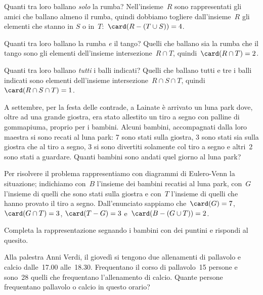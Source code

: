\begin{exrig}
\begin{esempio}
\begin{enumeratea}
\item Quanti tra loro ballano \emph{solo} la rumba? Nell'insieme~$R$ sono rappresentati gli amici che
ballano almeno il rumba, quindi dobbiamo togliere dall'insieme~$R$ gli elementi che stanno in
$S$ o in~$T$:~$\card(R-(T\cup S))=4$.

\item Quanti tra loro ballano la rumba \emph{e} il tango? Quelli che ballano sia la rumba che il tango sono gli elementi
dell'insieme intersezione~$R\cap T$, quindi~$\card(R\cap T)=2$.

\item Quanti tra loro ballano \emph{tutti} i balli indicati? Quelli che ballano tutti e tre i balli indicati sono elementi
dell'insieme intersezione~$R\cap S\cap T$, quindi~$\card(R\cap S\cap T)=1$.
\end{enumeratea}
 \end{esempio}

 \begin{esempio}
 A settembre, per la festa delle contrade, a Lainate è arrivato un luna
park dove, oltre ad una grande giostra, era stato allestito un tiro a
segno con palline di gommapiuma, proprio per i bambini. Alcuni
bambini, accompagnati dalla loro maestra si sono recati al luna park: 7
sono stati sulla giostra, 3 sono stati sia sulla giostra che al tiro a
segno, 3 si sono divertiti solamente col tiro a segno e altri~2 sono
stati a guardare. Quanti bambini sono andati quel giorno al luna park?

\begin{multicols}{2}
Per risolvere il problema rappresentiamo con diagrammi di Eulero-Venn la situazione; indichiamo con~$B$ l'insieme dei
bambini recatisi al luna park, con~$G$ l'insieme di quelli che sono stati sulla giostra e con~$T$ l'insieme
di quelli che hanno provato il tiro a segno.
Dall'enunciato sappiamo che~$\card(G)=7$, $\card(G\cap T)=3$, $\card(T-G)=3$ e~$\card(B-(G\cup T))=2$.
\begin{center}
 
\end{center}
\end{multicols}

Completa la rappresentazione segnando i bambini con dei puntini e rispondi al quesito.
\end{esempio}

\begin{esempio}
Alla palestra Anni Verdi, il giovedì si tengono due allenamenti di pallavolo e calcio dalle~17.00 alle~18.30. Frequentano il corso di
pallavolo~15 persone e sono~28 quelli che frequentano l'allenamento di calcio. Quante persone frequentano
pallavolo o calcio in questo orario?

\end{esempio}
\end{exrig}
